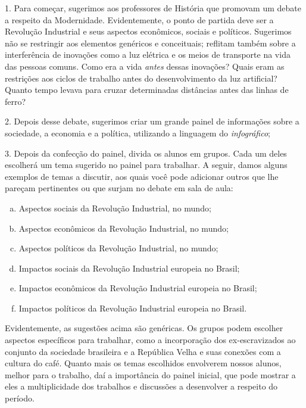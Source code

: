 \documentclass[11pt]{extarticle}
\begin{document}
1. Para começar, sugerimos aos professores de História que promovam um
debate a respeito da Modernidade. Evidentemente, o ponto de partida deve
ser a Revolução Industrial e seus aspectos econômicos, sociais e
políticos. Sugerimos não se restringir aos elementos genéricos e
conceituais; reflitam também sobre a interferência de inovações como a
luz elétrica e os meios de transporte na vida das pessoas comuns. Como
era a vida \emph{antes} dessas inovações? Quais eram as restrições aos
ciclos de trabalho antes do desenvolvimento da luz artificial? Quanto
tempo levava para cruzar determinadas distâncias antes das linhas de
ferro?

2. Depois desse debate, sugerimos criar um grande painel de informações
sobre a sociedade, a economia e a política, utilizando a linguagem do
\emph{infográfico};



3. Depois da confecção do painel, divida os alunos em grupos. Cada um
deles escolherá um tema sugerido no painel para trabalhar. A seguir,
damos alguns exemplos de temas a discutir, aos quais você pode adicionar
outros que lhe pareçam pertinentes ou que surjam no debate em sala de
aula:

\begin{enumerate}[(a)]  

\item Aspectos sociais da Revolução Industrial, no mundo;

\item Aspectos econômicos da Revolução Industrial, no mundo;

\item Aspectos políticos da Revolução Industrial, no mundo;

\item Impactos sociais da Revolução Industrial europeia no Brasil;

\item Impactos econômicos da Revolução Industrial europeia no Brasil;

\item Impactos políticos da Revolução Industrial europeia no Brasil.

\end{enumerate} 


Evidentemente, as sugestões acima são genéricas. Os grupos podem
escolher aspectos específicos para trabalhar, como a incorporação dos
ex-escravizados ao conjunto da sociedade brasileira e a República Velha
e suas conexões com a cultura do café. Quanto mais os temas escolhidos
envolverem nossos alunos, melhor para o trabalho, daí a importância do
painel inicial, que pode mostrar a eles a multiplicidade dos trabalhos e
discussões a desenvolver a respeito do período.
\end{document}
